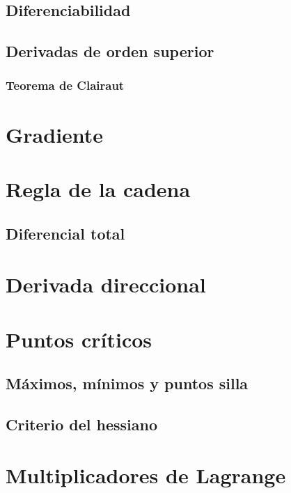 \documentclass[12pt, fleqn]{report}                             %
\theoremstyle{break}                                            %
\begin{document}
            \subsection{Diferenciabilidad}
            
            \subsection{Derivadas de orden superior}
            
                \subsubsection{Teorema de Clairaut}
                
        \section{Gradiente}
                
        \section{Regla de la cadena}
        
            \subsection{Diferencial total}
            
        \section{Derivada direccional}
        
        \section{Puntos críticos}
        
            \subsection{Máximos, mínimos y puntos silla}
            
            \subsection{Criterio del hessiano}
            
        \section{Multiplicadores de Lagrange}
\end{document}
